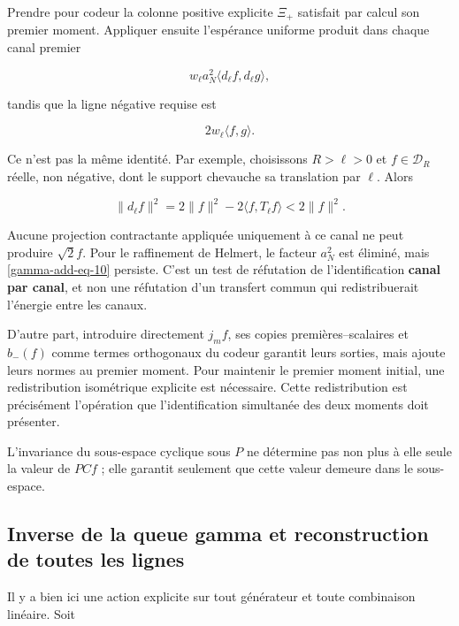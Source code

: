 Prendre pour codeur la colonne positive explicite \(\Xi_+\) satisfait par calcul son premier moment. Appliquer ensuite l'espérance uniforme produit dans chaque canal premier

\begin{equation}
w_\ell a_N^2\langle d_\ell f,d_\ell g\rangle,
\label{gamma-add-display-22}
\end{equation}

tandis que la ligne négative requise est

\begin{equation}
2w_\ell\langle f,g\rangle.
\label{gamma-add-display-23}
\end{equation}

Ce n'est pas la même identité. Par exemple, choisissons \(R>\ell>0\) et \(f\in\mathcal D_R\) réelle, non négative, dont le support chevauche sa translation par \(\ell\). Alors

\begin{equation}
\|d_\ell f\|^2
=2\|f\|^2-2\langle f,T_\ell f\rangle
<2\|f\|^2.
\label{gamma-add-eq-10}
\end{equation}

Aucune projection contractante appliquée uniquement à ce canal ne peut produire \(\sqrt2f\). Pour le raffinement de Helmert, le facteur \(a_N^2\) est éliminé, mais \eqref{gamma-add-eq-10} persiste. C'est un test de réfutation de l'identification \textbf{canal par canal}, et non une réfutation d'un transfert commun qui redistribuerait l'énergie entre les canaux.

D'autre part, introduire directement \(j_mf\), ses copies premières--scalaires et \(b_-(f)\) comme termes orthogonaux du codeur garantit leurs sorties, mais ajoute leurs normes au premier moment. Pour maintenir le premier moment initial, une redistribution isométrique explicite est nécessaire. Cette redistribution est précisément l'opération que l'identification simultanée des deux moments doit présenter.

L'invariance du sous-espace cyclique sous \(P\) ne détermine pas non plus à elle seule la valeur de \(PCf\) ; elle garantit seulement que cette valeur demeure dans le sous-espace.

\subsection{Inverse de la queue gamma et reconstruction de toutes les lignes}
\label{gamma-add-sub-288}

Il y a bien ici une action explicite sur tout générateur et toute combinaison linéaire. Soit


